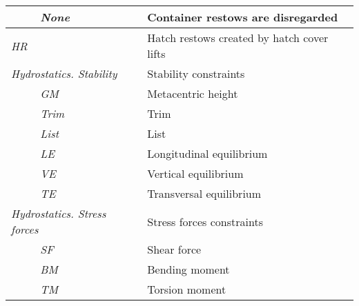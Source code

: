 \documentclass[preprint,12pt,authoryear]{elsarticle}
\begin{document}
\begin{table}[h!]
{\begin{tabular}{lll}
    \textit{}        & \textit{None}                & Container restows are disregarded                                                                              \\ \hline
    \multicolumn{2}{l}{\textit{HR}}                 & Hatch restows created by hatch cover lifts                                                                                       \\ \hline
    \multicolumn{2}{l}{\textit{Hydrostatics. Stability}}       & Stability constraints                                                                                   \\ \hline
    \textit{}        & \textit{GM}                  & Metacentric height                                                                                      \\ \hline
    \textit{}        & \textit{Trim}                & Trim                                                                                                    \\ \hline
    \textit{}        & \textit{List}                  & List                                                                                  \\ \hline
    \textit{}        & \textit{LE}                  & Longitudinal equilibrium                                                                                 \\ \hline
    \textit{}        & \textit{VE}                  & Vertical equilibrium                                                                                     \\ \hline
    \textit{}        & \textit{TE}                  & Transversal equilibrium                                                                                     \\ \hline
    \multicolumn{2}{l}{\textit{Hydrostatics. Stress forces}}       & Stress forces constraints                                                                                   \\ \hline
    \textit{}        & \textit{SF}                  & Shear force                                                                                             \\ \hline
    \textit{}        & \textit{BM}                  & Bending moment                                                                                          \\ \hline
    \textit{}        & \textit{TM}                  & Torsion moment                                                                                          \\ \hline

\end{tabular}}
\end{table}
\end{document}
